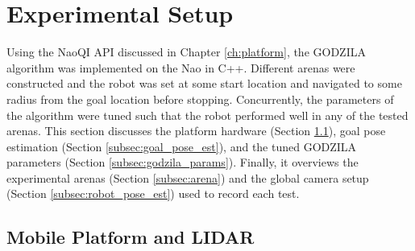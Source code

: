 \section{Experimental Setup} \label{sec:nav_exp_setup}
Using the NaoQI API discussed in Chapter \ref{ch:platform}, the GODZILA algorithm was implemented 
on the Nao in C++. Different arenas were constructed and the robot was set at
some start location and navigated to some radius from the goal location before stopping.
Concurrently, the parameters of the algorithm were tuned such that the robot performed
well in any of the tested arenas. This section discusses the platform hardware
(Section \ref{subsec:nao_and_lidar}), goal pose estimation (Section \ref{subsec:goal_pose_est}),
and the tuned GODZILA parameters (Section \ref{subsec:godzila_params}).
Finally, it overviews the experimental arenas (Section \ref{subsec:arena}) and the
global camera setup (Section \ref{subsec:robot_pose_est}) used to record each test.

\subsection{Mobile Platform and LIDAR} \label{subsec:nao_and_lidar}

